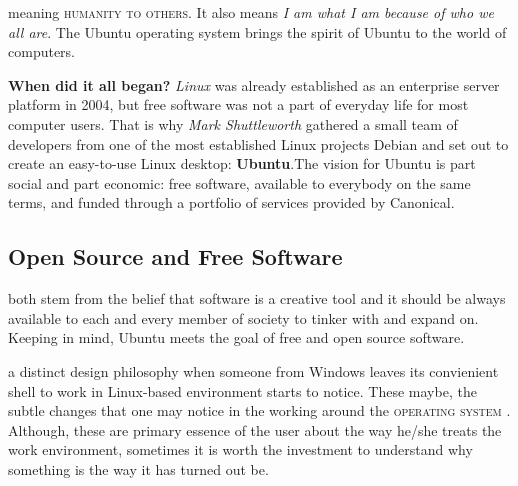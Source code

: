 \documentclass{tufte-book} %
\begin{document}
 meaning \textsc{humanity to others}. It also means \emph{I am what I am because of who we all are}. The Ubuntu operating system brings the spirit of Ubuntu to the world of computers.

\textbf{When did it all began?}
\emph{Linux} was already established as an enterprise server platform in 2004, but free software was not a part of everyday life for most computer users. That is why \textit{Mark Shuttleworth} gathered a small team of developers from one of the most established Linux projects Debian and set out to create an easy-to-use Linux desktop:\textbf{ Ubuntu}.The vision for Ubuntu is part social and part economic: free software, available to everybody on the same terms, and funded through a portfolio of services provided by Canonical.
\subsection[Open Source]{Open Source and Free Software }

both stem from the belief that software is a creative tool and it should be always available to each and every member of society to tinker with and expand on. Keeping in mind, Ubuntu meets the goal of free and open source software. 

 a distinct design philosophy when someone from Windows  leaves its convienient shell to work in Linux-based environment starts to notice. These maybe, the subtle changes that one may notice in the working around the \textsc{operating system }. Although, these are primary essence of the user about the way he/she treats the work environment, sometimes it is worth the investment to understand why something is the way it has turned out be.
\end{document}
